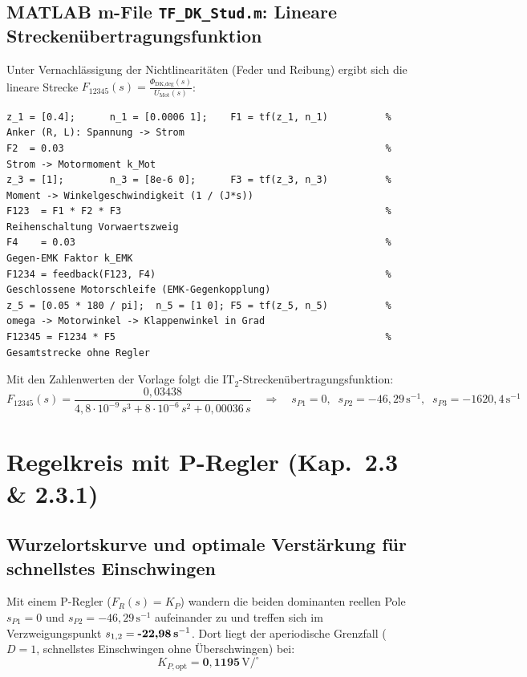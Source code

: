 \documentclass[a4paper,10pt,department=FakEI]{OTHRartcl}
\begin{document}
\subsection{MATLAB m-File \texttt{TF\_DK\_Stud.m}: Lineare Streckenübertragungsfunktion}
Unter Vernachlässigung der Nichtlinearitäten (Feder und Reibung) ergibt sich die lineare Strecke $F_{12345}(s) = \frac{\Phi_{\text{DK,deg}}(s)}{U_{\text{Mot}}(s)}$:
\begin{lstlisting}[style=matlabstyle]
z_1 = [0.4];      n_1 = [0.0006 1];    F1 = tf(z_1, n_1)          % Anker (R, L): Spannung -> Strom
F2  = 0.03                                                        % Strom -> Motormoment k_Mot
z_3 = [1];        n_3 = [8e-6 0];      F3 = tf(z_3, n_3)          % Moment -> Winkelgeschwindigkeit (1 / (J*s))
F123  = F1 * F2 * F3                                              % Reihenschaltung Vorwaertszweig
F4    = 0.03                                                      % Gegen-EMK Faktor k_EMK
F1234 = feedback(F123, F4)                                        % Geschlossene Motorschleife (EMK-Gegenkopplung)
z_5 = [0.05 * 180 / pi];  n_5 = [1 0]; F5 = tf(z_5, n_5)          % omega -> Motorwinkel -> Klappenwinkel in Grad
F12345 = F1234 * F5                                               % Gesamtstrecke ohne Regler
\end{lstlisting}
Mit den Zahlenwerten der Vorlage folgt die $\text{IT}_2$-Streckenübertragungsfunktion:
\begin{equation}
    F_{12345}(s) = \frac{0{,}03438}{4{,}8\cdot 10^{-9}\,s^3 + 8\cdot 10^{-6}\,s^2 + 0{,}00036\,s} \quad\Longrightarrow\quad s_{P1} = 0,\;\; s_{P2} = -46{,}29\,\text{s}^{-1},\;\; s_{P3} = -1620{,}4\,\text{s}^{-1}
\end{equation}

\clearpage

\section{Regelkreis mit P-Regler (Kap.~2.3 \& 2.3.1)}

\subsection{Wurzelortskurve und optimale Verstärkung für schnellstes Einschwingen}
Mit einem P-Regler ($F_R(s) = K_P$) wandern die beiden dominanten reellen Pole $s_{P1} = 0$ und $s_{P2} = -46{,}29\,\text{s}^{-1}$ aufeinander zu und treffen sich im Verzweigungspunkt $s_{1,2} = \textbf{-22,98\,s}^{-1}$. Dort liegt der aperiodische Grenzfall ($D = 1$, schnellstes Einschwingen ohne Überschwingen) bei:
\begin{equation}
    K_{P,\text{opt}} = \mathbf{0{,}1195}\,\text{V}/^\circ
\end{equation}
\end{document}
